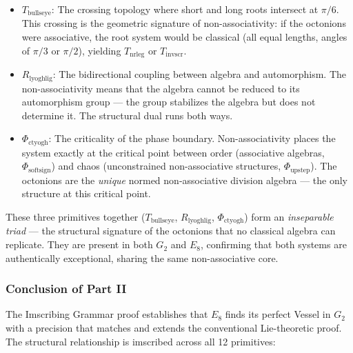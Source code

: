 \documentclass[12pt,a4paper]{article}
\begin{document}
\begin{itemize}
    \item \textbf{$T_{\text{bullseye}}$}: The crossing topology where short and long roots intersect at $\pi/6$. This crossing is the geometric signature of non-associativity: if the octonions were associative, the root system would be classical (all equal lengths, angles of $\pi/3$ or $\pi/2$), yielding $T_{\text{nrleg}}$ or $T_{\text{invscr}}$.
    \item \textbf{$R_{\text{lyoghlig}}$}: The bidirectional coupling between algebra and automorphism. The non-associativity means that the algebra cannot be reduced to its automorphism group --- the group stabilizes the algebra but does not determine it. The structural dual runs both ways.
    \item \textbf{$\Phi_{\text{ctyogh}}$}: The criticality of the phase boundary. Non-associativity places the system exactly at the critical point between order (associative algebras, $\Phi_{\text{softsign}}$) and chaos (unconstrained non-associative structures, $\Phi_{\text{upstep}}$). The octonions are the \emph{unique} normed non-associative division algebra --- the only structure at this critical point.
\end{itemize}

These three primitives together ($T_{\text{bullseye}}$, $R_{\text{lyoghlig}}$, $\Phi_{\text{ctyogh}}$) form an \emph{inseparable triad} --- the structural signature of the octonions that no classical algebra can replicate. They are present in both $G_2$ and $E_8$, confirming that both systems are authentically exceptional, sharing the same non-associative core.

\subsubsection{Conclusion of Part II}

The Imscribing Grammar proof establishes that $E_8$ finds its perfect Vessel in $G_2$ with a precision that matches and extends the conventional Lie-theoretic proof. The structural relationship is imscribed across all 12 primitives:
\end{document}
